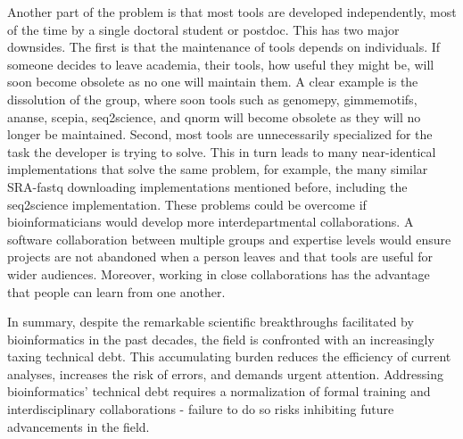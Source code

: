 Another part of the problem is that most tools are developed independently, most of the time by a single doctoral student or postdoc. This has two major downsides. The first is that the maintenance of tools depends on individuals. If someone decides to leave academia, their tools, how useful they might be, will soon become obsolete as no one will maintain them. A clear example is the dissolution of the  group, where soon tools such as genomepy\cite{genomepy}, gimmemotifs\cite{Bruse_2018}, ananse\cite{Xu_2020}, scepia, seq2science\cite{seq2science}, and qnorm\cite{qnorm} will become obsolete as they will no longer be maintained. Second, most tools are unnecessarily specialized for the task the developer is trying to solve. This in turn leads to many near-identical implementations that solve the same problem, for example, the many similar SRA-fastq downloading implementations mentioned before, including the seq2science implementation. These problems could be overcome if bioinformaticians would develop more interdepartmental collaborations. A software collaboration between multiple groups and expertise levels would ensure projects are not abandoned when a person leaves and that tools are useful for wider audiences. Moreover, working in close collaborations has the advantage that people can learn from one another.

In summary, despite the remarkable scientific breakthroughs facilitated by bioinformatics in the past decades, the field is confronted with an increasingly taxing technical debt. This accumulating burden reduces the efficiency of current analyses, increases the risk of errors, and demands urgent attention. Addressing bioinformatics' technical debt requires a normalization of formal training and interdisciplinary collaborations - failure to do so risks inhibiting future advancements in the field.
